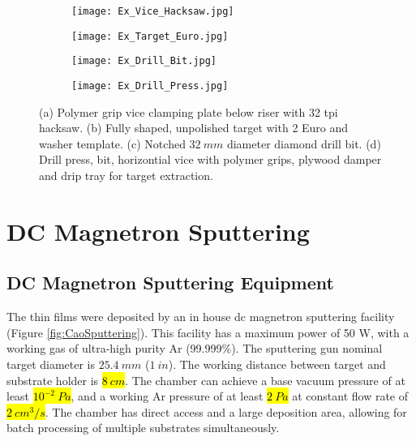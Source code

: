 \documentclass[a4paper,12pt,oneside]{report}%
\begin{document}
\begin{figure}[htbp]
	\centering
	\begin{subfigure}[htbp]{0.49\textwidth}
		\texttt{[image: Ex\_Vice\_Hacksaw.jpg]}
		\caption{}
		\label{fig:Vice}
	\end{subfigure}
	\begin{subfigure}[htbp]{0.38\textwidth}
		\texttt{[image: Ex\_Target\_Euro.jpg]}
		\caption{}
		\label{fig:TargetEuro}
	\end{subfigure}
	\begin{subfigure}[htbp]{0.275\textwidth}
		\texttt{[image: Ex\_Drill\_Bit.jpg]}
		\caption{}
		\label{fig:DrillBit}
	\end{subfigure}
	\begin{subfigure}[htbp]{0.30\textwidth}
		\texttt{[image: Ex\_Drill\_Press.jpg]}
		\caption{}
		\label{fig:DrillPress}
	\end{subfigure}
	\caption{(a) Polymer grip vice clamping plate below riser with 32 \acrshort{tpi} hacksaw. (b) Fully shaped, unpolished target with 2 Euro and washer template. (c) Notched $32~ mm$ diameter diamond drill bit. (d) Drill press, bit, horizontial vice with polymer grips, plywood damper and drip tray for target extraction.}%
	\label{fig:ShapingEquipment}
\end{figure}

\clearpage

\section{DC Magnetron Sputtering}
\subsection{DC Magnetron Sputtering Equipment}
The thin films were deposited by an in house \acrshort{dc} magnetron sputtering facility (Figure \ref{fig:CaoSputtering}). This facility has a maximum power of 50 W, with a working gas of ultra-high purity Ar (99.999\%). The sputtering gun nominal target diameter is $25.4~ mm$ ($1~ in$). The working distance between target and substrate holder is \hl{$8~ cm$}. The chamber can achieve a base vacuum pressure of at least \hl{$10^{-2}~ Pa$}, and a working Ar pressure of at least \hl{$2~ Pa$} at constant flow rate of \hl{$2~ cm^{3}/s$}. The chamber has direct access and a large deposition area, allowing for batch processing of multiple substrates simultaneously.
\end{document}

